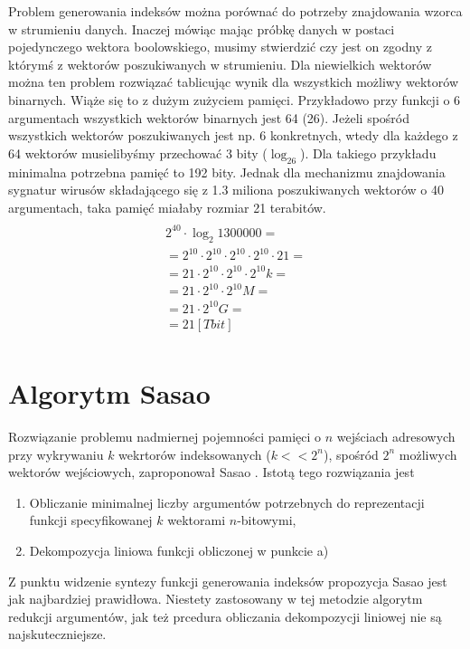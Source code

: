 Problem generowania indeksów można porównać do potrzeby znajdowania wzorca w strumieniu danych.
Inaczej mówiąc mając próbkę danych w postaci pojedynczego wektora boolowskiego, musimy stwierdzić czy jest on zgodny z którymś z wektorów poszukiwanych w strumieniu.
Dla niewielkich wektorów można ten problem rozwiązać tablicując wynik dla wszystkich możliwy wektorów binarnych.
Wiąże się to z dużym zużyciem pamięci.
Przykładowo przy funkcji o 6 argumentach wszystkich wektorów binarnych jest 64 (26).
Jeżeli spośród wszystkich wektorów poszukiwanych jest np. 6 konkretnych, wtedy dla każdego z 64 wektorów musielibyśmy przechować 3 bity ($\log_26$).
Dla takiego przykładu minimalna potrzebna pamięć to 192 bity.
Jednak dla mechanizmu znajdowania sygnatur wirusów składającego się z 1.3 miliona poszukiwanych wektorów o 40 argumentach, taka pamięć miałaby rozmiar 21 terabitów.
\begin{multline} \\
2^{40} \cdot \log_2 1300000 = \\
= 2^{10} \cdot 2^{10} \cdot 2^{10} \cdot 2^{10} \cdot 21 = \\
=21 \cdot 2^{10} \cdot 2^{10} \cdot 2^{10} k = \\
=21 \cdot 2^{10} \cdot 2^{10} M = \\
=21 \cdot 2^{10} G = \\
=21 [Tbit] \\
\end{multline}

\section{Algorytm Sasao}
Rozwiązanie problemu nadmiernej pojemności pamięci o $n$ wejściach adresowych przy wykrywaniu $k$ wekrtorów indeksowanych ($k<<2^n$),
spośród $2^n$ możliwych wektorów wejściowych,
zaproponował Sasao \cite{sasao-workshop, sasao-recent, sasao-s-min, sasao-synthesis}.
Istotą tego rozwiązania jest
\begin{enumerate}[label=\alph*)]
\item Obliczanie minimalnej liczby argumentów potrzebnych do reprezentacji funkcji specyfikowanej $k$ wektorami $n$-bitowymi,
\item Dekompozycja liniowa funkcji obliczonej w punkcie a)
\end{enumerate}

Z punktu widzenie syntezy funkcji generowania indeksów propozycja Sasao jest jak najbardziej prawidłowa. Niestety zastosowany w tej metodzie algorytm redukcji argumentów,
jak też prcedura obliczania dekompozycji liniowej nie są najskuteczniejsze.

